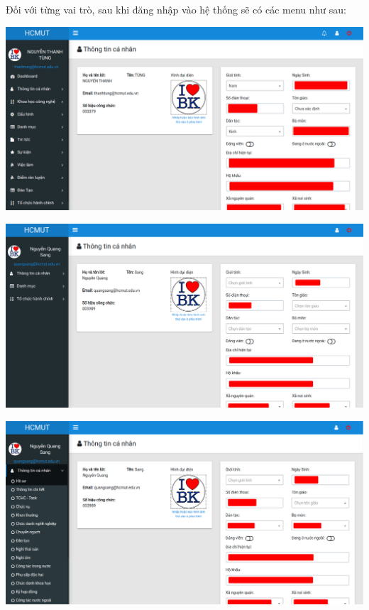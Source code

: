Đối với từng vai trò, sau khi đăng nhập vào hệ thống sẽ có các menu như sau:
\begin{center}
  \captionsetup{type=figure}
  \includegraphics[width=15cm]{img/Screen/admin.png}
\end{center}
\begin{center}
  \captionsetup{type=figure}
  \includegraphics[width=15cm]{img/Screen/manager.png}
\end{center}
\begin{center}
  \captionsetup{type=figure}
  \includegraphics[width=15cm]{img/Screen/canbo.png}
\end{center}
